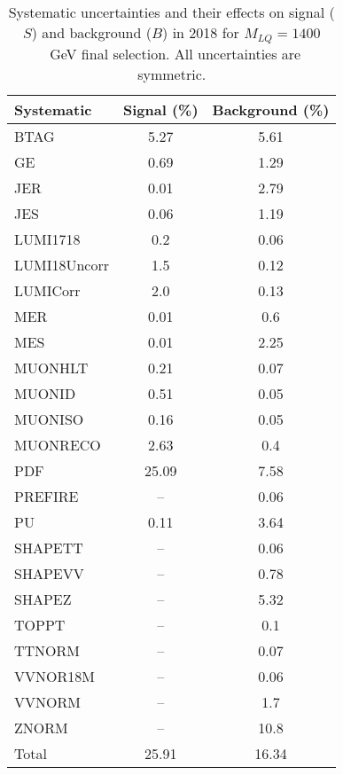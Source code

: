 \begin{table}[htbp]
\begin{center}
\caption{Systematic uncertainties and their effects on signal ($S$) and background ($B$) in 2018 for $M_{LQ}=1400$~GeV final selection. All uncertainties are symmetric.}
\begin{tabular}{lcc}
\hline\hline
Systematic & Signal (\%) & Background (\%) \\ \hline 
BTAG & 5.27 & 5.61\\ 
GE & 0.69 & 1.29\\ 
JER & 0.01 & 2.79\\ 
JES & 0.06 & 1.19\\ 
LUMI1718 & 0.2 & 0.06\\ 
LUMI18Uncorr & 1.5 & 0.12\\ 
LUMICorr & 2.0 & 0.13\\ 
MER & 0.01 & 0.6\\ 
MES & 0.01 & 2.25\\ 
MUONHLT & 0.21 & 0.07\\ 
MUONID & 0.51 & 0.05\\ 
MUONISO & 0.16 & 0.05\\ 
MUONRECO & 2.63 & 0.4\\ 
PDF & 25.09 & 7.58\\ 
PREFIRE & -- & 0.06\\ 
PU & 0.11 & 3.64\\ 
SHAPETT & -- & 0.06\\ 
SHAPEVV & -- & 0.78\\ 
SHAPEZ & -- & 5.32\\ 
TOPPT & -- & 0.1\\ 
TTNORM & -- & 0.07\\ 
VVNOR18M & -- & 0.06\\ 
VVNORM & -- & 1.7\\ 
ZNORM & -- & 10.8\\ 
Total & 25.91 & 16.34\\ \hline \hline
\end{tabular}
\label{tab:SysUncertainties_uujj_1400}
\end{center}
\end{table}

